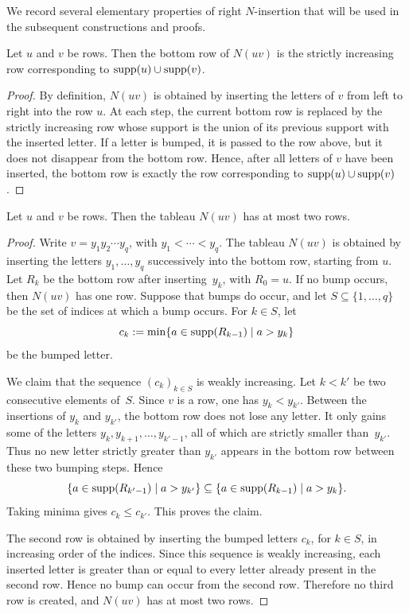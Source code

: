 \documentclass[a4paper, twoside, 11pt, english]{article}
\begin{document}
We record several elementary properties of right $N$-insertion that will be
used in the subsequent constructions and proofs.


\begin{lemma}
\label{L:BottomRowUnion}
Let $u$ and $v$ be rows. Then the bottom row of $N(uv)$ is the strictly
increasing row corresponding to $\operatorname{supp}(u)\cup\operatorname{supp}(v)$.
\end{lemma}

\begin{proof}
By definition, $N(uv)$ is obtained by inserting the letters of $v$ from left to
right into the row $u$. At each step, the current bottom row is replaced by the
strictly increasing row whose support is the union of its previous support with
the inserted letter. If a letter is bumped, it is passed to the row above, but it
does not disappear from the bottom row. Hence, after all letters of $v$ have
been inserted, the bottom row is exactly the row corresponding to
$\operatorname{supp}(u)\cup\operatorname{supp}(v)$.
\end{proof}

\begin{lemma}
\label{L:TwoRowsProductRows}
Let $u$ and $v$ be rows. Then the tableau $N(uv)$ has at most two rows.
\end{lemma}

\begin{proof}
Write $v=y_1y_2\cdots y_q$, with $y_1<\cdots<y_q$. The tableau $N(uv)$ is
obtained by inserting the letters $y_1,\dots,y_q$ successively into the bottom
row, starting from $u$. Let $R_k$ be the bottom row after inserting~$y_k$, with
$R_0=u$.
If no bump occurs, then $N(uv)$ has one row. Suppose that bumps do occur, and
let $S\subseteq\{1,\dots,q\}$ be the set of indices at which a bump occurs. For
$k\in S$, let
\[
c_k:=\min\{a\in\operatorname{supp}(R_{k-1})\mid a>y_k\}
\]
be the bumped letter.

We claim that the sequence $(c_k)_{k\in S}$ is weakly increasing. Let
$k<k'$ be two consecutive elements of~$S$. Since $v$ is a row, one has
$y_k<y_{k'}$. Between the insertions of $y_k$ and $y_{k'}$, the bottom row does
not lose any letter. It only gains some of the letters
$y_k,y_{k+1},\dots,y_{k'-1}$, all of which are strictly smaller than~$y_{k'}$.
Thus no new letter strictly greater than $y_{k'}$ appears in the bottom row
between these two bumping steps. Hence
\[
\{a\in\operatorname{supp}(R_{k'-1})\mid a>y_{k'}\}
\subseteq
\{a\in\operatorname{supp}(R_{k-1})\mid a>y_k\}.
\]
Taking minima gives $c_k\le c_{k'}$. This proves the claim.

The second row is obtained by inserting the bumped letters $c_k$, for
$k\in S$, in increasing order of the indices. Since this sequence is weakly
increasing, each inserted letter is greater than or equal to every letter
already present in the second row. Hence no bump can occur from the second row.
Therefore no third row is created, and $N(uv)$ has at most two rows.
\end{proof}
\end{document}
